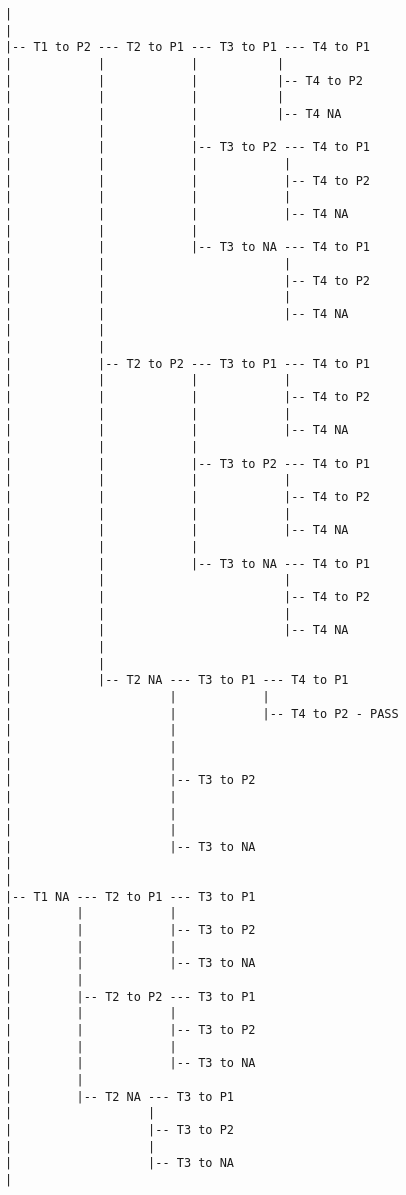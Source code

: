 \documentclass{article}
\begin{document}
\begin{enumerate}
\begin{enumerate}
\begin{verbatim}
			|             
			|             
			|-- T1 to P2 --- T2 to P1 --- T3 to P1 --- T4 to P1
			|            |            |           |
			|            |            |           |-- T4 to P2
			|            |            |           |
			|            |            |           |-- T4 NA
			|            |            |            
			|            |            |-- T3 to P2 --- T4 to P1
			|            |            |            |
			|            |            |            |-- T4 to P2
			|            |            |            |
			|            |            |            |-- T4 NA
			|            |            |
			|            |            |-- T3 to NA --- T4 to P1
			|            |                         |
			|            |                         |-- T4 to P2
			|            |                         |
			|            |                         |-- T4 NA
			|            |
			|            |
			|            |-- T2 to P2 --- T3 to P1 --- T4 to P1
			|            |            |            |
			|            |            |            |-- T4 to P2
			|            |            |            |
			|            |            |            |-- T4 NA
			|            |            |            
			|            |            |-- T3 to P2 --- T4 to P1
			|            |            |            |
			|            |            |            |-- T4 to P2
			|            |            |            |
			|            |            |            |-- T4 NA
			|            |            |
			|            |            |-- T3 to NA --- T4 to P1
			|            |                         |
			|            |                         |-- T4 to P2
			|            |                         |
			|            |                         |-- T4 NA
			|            |
			|            |
			|            |-- T2 NA --- T3 to P1 --- T4 to P1
			|                      |            |
			|                      |            |-- T4 to P2 - PASS
			|                      |            
			|                      |            
			|                      |            
			|                      |-- T3 to P2 
			|                      |            
			|                      |            
			|                      |            
			|                      |-- T3 to NA
			|                                      
			|                                      
			|-- T1 NA --- T2 to P1 --- T3 to P1
			|         |            |                     
			|         |            |-- T3 to P2 
			|         |            |            
			|         |            |-- T3 to NA 
			|         |                         
			|         |-- T2 to P2 --- T3 to P1
			|         |            |                  
			|         |            |-- T3 to P2 
			|         |            |            
			|         |            |-- T3 to NA 
			|         |                         
			|         |-- T2 NA --- T3 to P1 
			|                   |                      
			|                   |-- T3 to P2
			|                   |            
			|                   |-- T3 to NA                                      
			|                                      
			\end{verbatim}
			
		\end{enumerate}
		
	\end{enumerate}
\end{document}
